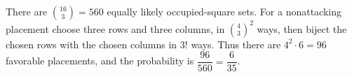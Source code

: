 There are $\binom{16}{3}=560$ equally likely occupied-square sets. For a nonattacking placement choose three rows and three columns, in $\binom43^2$ ways, then biject the chosen rows with the chosen columns in $3!$ ways. Thus there are $4^2\cdot6=96$ favorable placements, and the probability is $\dfrac{96}{560}=\boxed{\dfrac{6}{35}}$.
